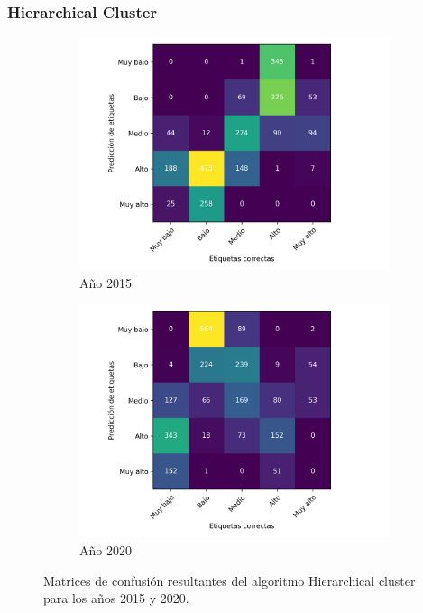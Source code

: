 \subsubsection{Hierarchical Cluster}

\begin{figure}[H]
    \centering
    \begin{subfigure}{8.4cm}
        \includegraphics[width=1\linewidth]{Graphics/Data_2015/Cluster_confusion_matrix.png}
        \caption{Año 2015}
    \end{subfigure}
    \begin{subfigure}{8.4cm}
        \includegraphics[width=1\linewidth]{Graphics/Data_2020/Cluster_confusion_matrix.png}
        \caption{Año 2020}
    \end{subfigure}
    \caption{Matrices de confusión resultantes del algoritmo Hierarchical cluster para los años 2015 y 2020.}
    \label{fig:cluster}
\end{figure}